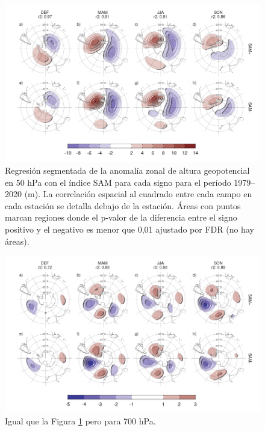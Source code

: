 \documentclass[12pt,oneside,a4paper]{reedthesis}
\begin{document}
\begin{figure}

{\centering \includegraphics{figures/30-sam/sign-regression-50-1} 

}

\caption{Regresión segmentada de la anomalía zonal de altura geopotencial en 50 hPa con el índice SAM para cada signo para el período 1979--2020 (m). La correlación espacial al cuadrado entre cada campo en cada estación se detalla debajo de la estación. Áreas con puntos marcan regiones donde el p-valor de la diferencia entre el signo positivo y el negativo es menor que 0,01 ajustado por FDR (no hay áreas).}\label{fig:sign-regression-50}
\end{figure}



\begin{figure}

{\centering \includegraphics{figures/30-sam/sign-regression-700-1} 

}

\caption{Igual que la Figura \ref{fig:sign-regression-50} pero para 700 hPa.}\label{fig:sign-regression-700}
\end{figure}
\end{document}
